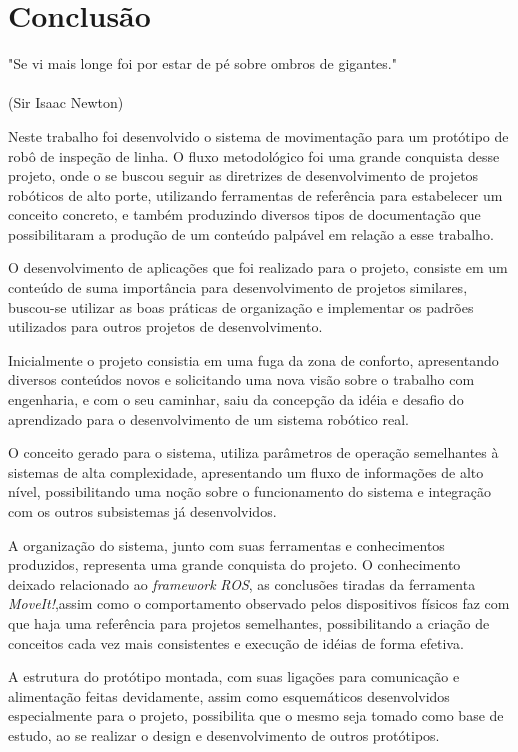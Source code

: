 \chapter{Conclusão}
\label{chap:conc}
\begin{flushright}
	"Se vi mais longe foi por estar de pé sobre ombros de gigantes." \\
	\ \\
	(Sir Isaac Newton)
\end{flushright}

Neste trabalho foi desenvolvido o sistema de movimentação para um protótipo de robô de inspeção de linha. O fluxo metodológico foi uma grande conquista desse projeto, onde o se buscou seguir as diretrizes de desenvolvimento de projetos robóticos de alto porte, utilizando ferramentas de referência para estabelecer um conceito concreto, e também produzindo diversos tipos de documentação que possibilitaram a produção de um conteúdo palpável em relação a esse trabalho.

O desenvolvimento de aplicações que foi realizado para o projeto, consiste em um conteúdo de suma importância para desenvolvimento de projetos similares, buscou-se utilizar as boas práticas de organização e implementar os padrões utilizados para outros projetos de desenvolvimento. 

Inicialmente o projeto consistia em uma fuga da zona de conforto, apresentando diversos conteúdos novos e solicitando uma nova visão sobre o trabalho com engenharia, e com o seu caminhar, saiu da concepção da idéia e desafio do aprendizado para o desenvolvimento de um sistema robótico real. 

O conceito gerado para o sistema, utiliza parâmetros de operação semelhantes à sistemas de alta complexidade, apresentando um fluxo de informações de alto nível, possibilitando uma noção sobre o funcionamento do sistema e integração com os outros subsistemas já desenvolvidos. 

A organização do sistema, junto com suas ferramentas e conhecimentos produzidos, representa uma grande conquista do projeto. O conhecimento deixado relacionado ao \textit{framework} \textit{ROS}, as conclusões tiradas da ferramenta \textit{MoveIt!},assim como o comportamento observado pelos dispositivos físicos faz com que haja uma referência para projetos semelhantes, possibilitando a criação de conceitos cada vez mais consistentes e execução de idéias de forma efetiva.

A estrutura do protótipo montada, com suas ligações para comunicação e alimentação feitas devidamente, assim como esquemáticos desenvolvidos especialmente para o projeto, possibilita que o mesmo seja tomado como base de estudo, ao se realizar o design e desenvolvimento de outros protótipos.

